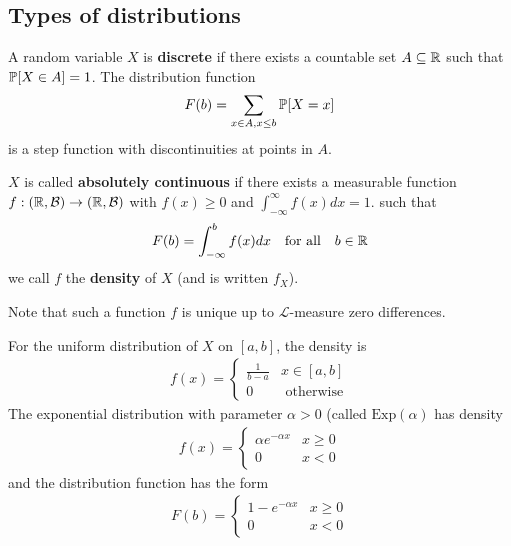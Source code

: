 \subsection{Types of distributions}
\begin{dfn}[]
  A random variable $X$ is \textbf{discrete} if there exists a countable set $A \subseteq \mathbb{R}$ such that $\mathbb{P}[X \in A] = 1$.
  The distribution function 
\begin{align*}
  F(b) = \sum_{x \in A, x \leq b}\mathbb{P}[X = x]
\end{align*}
is a step function with discontinuities at points in $A$.

$X$ is called \textbf{absolutely continuous} if there exists a measurable function $f:(\mathbb{R},\mathcal{B}) \to (\mathbb{R},\mathcal{B})$ with $f(x) \geq 0$ and $\int_{-\infty}^{\infty}f(x) dx = 1$. such that
\begin{align*}
  F(b) = \int_{-\infty}^{b}f(x) dx \quad \text{for all} \quad b \in \mathbb{R}
\end{align*}
we call $f$ the \textbf{density} of $X$ (and is written $f_X$).
\end{dfn}
Note that such a function $f$ is unique up to $\mathcal{L}$-measure zero differences.

\begin{ex}[]
  For the uniform distribution of $X$ on $[a,b]$, the density is 
  \begin{align*}
    f(x) = \left\{\begin{array}{ll}
        \frac{1}{b-a} & x \in [a,b]\\
      0 & \text{ otherwise}
    \end{array} \right.
  \end{align*}
  The exponential distribution with parameter $\alpha > 0$ (called $\text{Exp}(\alpha)$ has density
  \begin{align*}
    f(x) = \left\{\begin{array}{ll}
      \alpha e^{- \alpha x} & x \geq 0\\
      0 & x < 0
    \end{array} \right.
  \end{align*}
  and the distribution function has the form
  \begin{align*}
    F(b) = \left\{\begin{array}{ll}
      1 - e^{- \alpha x} & x \geq 0\\
      0 & x < 0
    \end{array} \right.
  \end{align*}
\end{ex}

